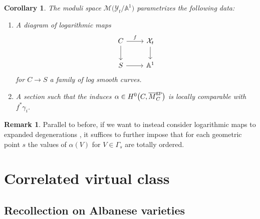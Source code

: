 \documentclass[pdftex]{sigma}
\newcommand{\M}{\mathcal{M}}
\newcommand{\X}{\mathcal{X}}
\newcommand{\Y}{\mathcal{Y}}
\renewcommand{\bar}{\overline}
\numberwithin{equation}{section}
\newtheorem{coro}[theo]{Corollary}
\theoremstyle{definition}
\newtheorem{remarkk}[theo]{Remark}
\begin{document}
\begin{coro}\label{prop:logmapsdegeneration}
 The moduli space $\M\bigl(\Y_t\slash\mathbb A^1\bigr)$ parametrizes the following data:
 \begin{enumerate}\itemsep=0pt
 \item[$(1)$] A diagram of logarithmic maps
 \[
 \begin{tikzcd}
 C\ar[r,"f"]\ar[d] & \X_t\ar[d]\\
 S\ar[r] &\mathbb A^1
 \end{tikzcd}
 \]
 for $C\to S$ a family of log smooth curves.
 \item[$(2)$] A section  such that the induces $\alpha\in H^0\bigl(C,\bar{M}_C^{\rm gp}\bigr)$ is locally comparable with $f^*\gamma_i$.
 \end{enumerate}
\end{coro}
\begin{remarkk}
 Parallel to before, if we want to instead consider logarithmic maps to expanded degenerations \cite{kim2010logarithmic,li2001stable,maulik2023logarithmic}, it suffices to further impose that for each geometric point $s$ the values of $\alpha(V)$ for $V\in\Gamma_s$ are totally ordered.
\end{remarkk}

\section{Correlated virtual class}

\subsection{Recollection on Albanese varieties}
\end{document}
